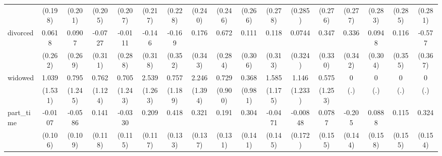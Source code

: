 {\begin{tabular}{l*{16}{c}}
                    &     (0.198)         &     (0.201)         &     (0.205)         &     (0.207)         &     (0.217)         &     (0.228)         &     (0.240)         &     (0.246)         &     (0.266)         &     (0.278)         &     (0.285)         &     (0.276)         &     (0.277)         &     (0.283)         &     (0.285)         &     (0.281)         \\
[1em]
divorced            &      0.0618         &      0.0907         &     -0.0727         &     -0.0111         &      -0.146         &      -0.169         &       0.176         &       0.672\sym{*}  &       0.111         &       0.118         &      0.0744         &       0.347         &       0.336         &      0.0948         &       0.116         &      -0.577         \\
                    &     (0.262)         &     (0.269)         &     (0.311)         &     (0.288)         &     (0.318)         &     (0.352)         &     (0.343)         &     (0.284)         &     (0.306)         &     (0.313)         &     (0.324)         &     (0.330)         &     (0.342)         &     (0.304)         &     (0.355)         &     (0.367)         \\
[1em]
widowed             &       1.039         &       0.795         &       0.762         &       0.705         &       2.539\sym{*}  &       0.757         &       2.246         &       0.729         &       0.368         &       1.585         &       1.146         &       0.575         &           0         &           0         &           0         &           0         \\
                    &     (1.531)         &     (1.245)         &     (1.124)         &     (1.243)         &     (1.263)         &     (1.189)         &     (1.394)         &     (0.900)         &     (0.981)         &     (1.175)         &     (1.233)         &     (1.253)         &         (.)         &         (.)         &         (.)         &         (.)         \\
[1em]
part\_time           &     -0.0107         &     -0.0586         &       0.141         &     -0.0330         &       0.209         &       0.418\sym{**} &       0.321\sym{*}  &       0.191         &       0.304\sym{*}  &     -0.0471         &    -0.00848         &      0.0787         &      -0.205         &      0.0888         &       0.115         &       0.324\sym{*}  \\
                    &     (0.106)         &     (0.109)         &     (0.118)         &     (0.115)         &     (0.117)         &     (0.133)         &     (0.137)         &     (0.131)         &     (0.141)         &     (0.145)         &     (0.172)         &     (0.155)         &     (0.144)         &     (0.158)         &     (0.155)         &     (0.154)         \\

\end{tabular}}
